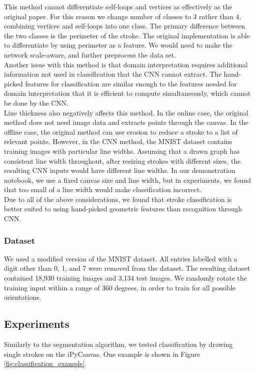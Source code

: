 This method cannot differentiate self-loops and vertices as effectively as the original paper. For this reason we change number of classes to 3 rather than 4, combining vertices and self-loops into one class. The primary difference between the two classes is the perimeter of the stroke. The original implementation is able to differentiate by using perimeter as a feature. We would need to make the network scale-aware, and further preprocess the data set. \\

Another issue with this method is that domain interpretation requires additional information not used in classification that the CNN cannot extract. The hand-picked features for classification are similar enough to the features needed for domain interpretation that it is efficient to compute simultaneously, which cannot be done by the CNN. \\

Line thickness also negatively affects this method. In the online case, the original method does not need image data and extracts points through the canvas. In the offline case, the original method can use erosion to reduce a stroke to a list of relevant points. However, in the CNN method, the MNIST dataset contains training images with particular line widths. Assuming that a drawn graph has consistent line width throughout, after resizing strokes with different sizes, the resulting CNN inputs would have different line widths. In our demonstration notebook, we use a fixed canvas size and line width, but in experiments, we found that too small of a line width would make classification incorrect. \\

Due to all of the above considerations, we found that stroke classification is better suited to using hand-picked geometric features than recognition through CNN.

\subsubsection{Dataset}

We used a modified version of the MNIST dataset. All entries labelled with a digit other than 0, 1, and 7 were removed from the dataset. The resulting dataset contained 18,930 training images and 3,134 test images. We randomly rotate the training input within a range of 360 degrees, in order to train for all possible orientations.

\subsection{Experiments}
Similarly to the segmentation algorithm, we tested classification by drawing single strokes on the iPyCanvas. One example is shown in Figure \ref{fig:classification_example}.

